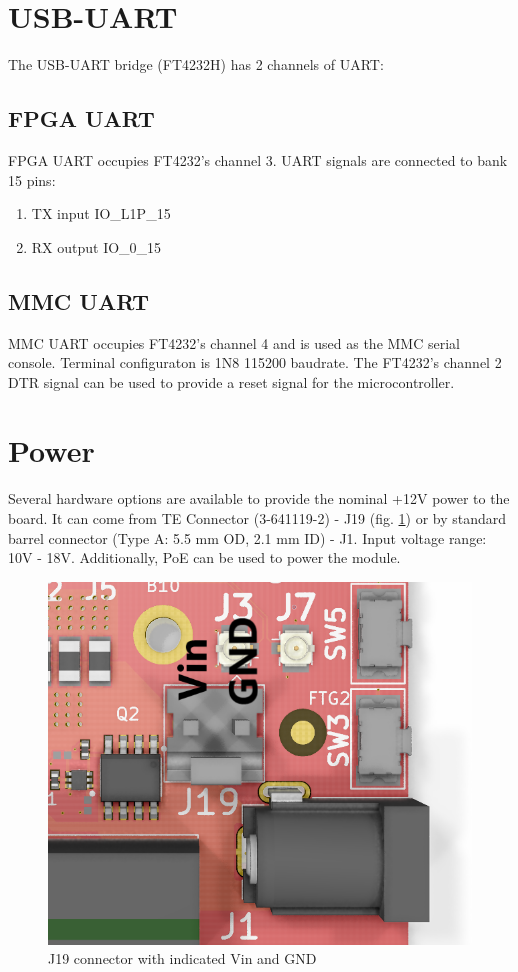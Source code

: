 \documentclass[12pt,oneside,a4]{article}
\begin{document}
\section{USB-UART}
The USB-UART bridge (FT4232H) has 2 channels of UART:
\subsection{FPGA UART}
FPGA UART occupies FT4232's channel 3. UART signals are connected to bank 15 pins:
\begin{enumerate}
	\item TX input IO\_L1P\_15
	\item RX output IO\_0\_15
\end{enumerate}
\subsection{MMC UART}
MMC UART occupies FT4232's channel 4 and is used as the MMC serial console. Terminal configuraton is 1N8 115200 baudrate. The FT4232's channel 2 DTR signal can be used to provide a reset signal for the microcontroller.


\section{Power}
Several hardware options are available to provide the nominal +12V power to the board.
It can come from TE Connector (3-641119-2) - J19 (fig. \ref{j19}) or by standard barrel connector (Type A: 5.5 mm OD, 2.1 mm ID) - J1. Input voltage range: 10V - 18V. Additionally, PoE can be used to power the module.

\begin{figure}[H]
\begin{center}
\includegraphics[width=0.6\linewidth]{j1j19.png}
 \caption{J19 connector with indicated Vin and GND}\label{j19}
\end{center}
\end{figure}
\end{document}

